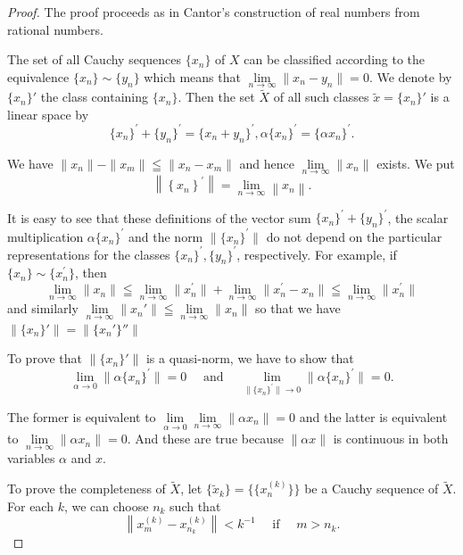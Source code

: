 \begin{proof}
 The proof proceeds as in Cantor's construction of real numbers from rational numbers. 


The set of all Cauchy sequences $\{x_{n}\}$ of $X$ can be classified according to the equivalence $\{x_{n}\} \sim \{y_{n}\}$ which means that $\lim\limits_{n\to \infty}\|x_n- y_n\| = 0$. We denote by $\{x_{n}\}'$ the class containing $\{x_{n}\}$. Then the set $\tilde{X}$ of all such classes $\tilde{x} = \{x_{n}\}'$ is a linear space by 
\[
\{x_{n} \} ^{\prime} + \{y_{n} \} ^{\prime} = \{x_{n} + y_{n} \} ^{\prime}, \alpha \{x_{n} \} ^{\prime} = \{\alpha x_{n} \} ^{\prime}.
\]

We have $\|x_n\|- \|x_m\| \leqq \|x_n- x_m\|$ and hence $\lim\limits_{n \to \infty} \|x_n\|$ exists. We put 
\[
\left\|\left\{x_{n} \right\} ^{\prime} \right\| = \lim\limits_{n \rightarrow \infty} \left\| x_{n} \right\|.
\]

It is easy to see that these definitions of the vector sum $\{x_{n}\}^{\prime} + \{y_{n}\}^{\prime}$, the scalar multiplication $\alpha\{x_{n}\}^{\prime}$ and the norm $\|\{x_{n}\}^{\prime}\|$ do not depend on the particular representations for the classes $\{x_{n}\}^{\prime}, \{y_{n}\}^{\prime}$, respectively. For example, if $\{x_{n}\} \sim \{x_{n}^{\prime}\}$, then 
\[
\lim\limits_{n \rightarrow \infty} \| x_{n} \| \leqq \lim\limits_{n \rightarrow \infty} \| x_{n} ^{\prime} \| + \lim\limits_{n \rightarrow \infty} \| x_{n} ^{\prime}- x_{n} \| \leqq \lim\limits_{n \rightarrow \infty} \| x_{n} ^{\prime} \|
\]
and similarly $\lim\limits_{n\to \infty}\|x_n'\|\leqq \lim\limits_{n\to \infty}\|x_n\|$ so that we have $\|\{x_n\}'\| = \|\{x_n'\}''\|$ 

To prove that $\|\{x_n\}'\|$ is a quasi-norm, we have to show that 
\[
\lim\limits_{\alpha \rightarrow 0} \| \alpha \{x_{n} \} ^{\prime} \| = 0 \quad \text{ and } \quad \lim\limits_ {\| \{x_{n} \} ^{\prime} \| \rightarrow 0} \| \alpha \{x_{n} \} ^{\prime} \| = 0.
\]

The former is equivalent to $\lim\limits_{\alpha\to0}\lim\limits_{n\to\infty}\|\alpha x_{n}\|=0$ and the latter is equivalent to $\lim\limits_{n\to\infty}\|\alpha x_{n}\|=0$. And these are true because $\|\alpha x\|$ is continuous in both variables $\alpha$ and $x$. 

To prove the completeness of $\tilde{X}$, let $\{\tilde{x}_k\} = \{\{x_n^{(k)}\}\}$ be a Cauchy sequence of $\tilde{X}$. For each $k$, we can choose $n_k$ such that 
\begin{equation}\label{eq:I.10.2}
\left\| x_{m} ^{(k)}- x_ {n_{k}} ^{(k)} \right\| < k ^{-1} \quad \text{ if } \quad m > n_{k}.
\end{equation}


\end{proof}
